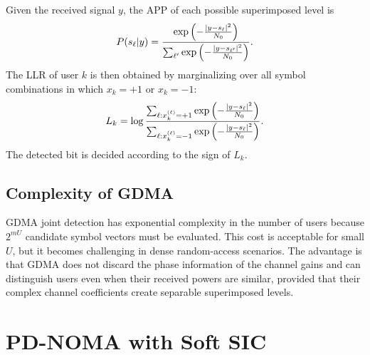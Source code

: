 Given the received signal $y$, the APP of each possible superimposed level is
\begin{equation}
    P(s_\ell|y) =
    \frac{\exp\left(-\frac{\left\lvert y-s_\ell \right\rvert^2}{N_0}\right)}
    {\sum_{\ell'}\exp\left(-\frac{\left\lvert y-s_{\ell'} \right\rvert^2}{N_0}\right)} .
\end{equation}
The LLR of user $k$ is then obtained by marginalizing over all symbol combinations in which $x_k=+1$ or $x_k=-1$:
\begin{equation}
    L_k
    =\log
    \frac{
    \sum_{\ell:x_k^{(\ell)}=+1}
    \exp\left(-\frac{\left\lvert y-s_\ell \right\rvert^2}{N_0}\right)}
    {\sum_{\ell:x_k^{(\ell)}=-1}
    \exp\left(-\frac{\left\lvert y-s_\ell \right\rvert^2}{N_0}\right)} .
    \label{eq:gdma-llr}
\end{equation}
The detected bit is decided according to the sign of $L_k$.



\subsection{Complexity of GDMA}

GDMA joint detection has exponential complexity in the number of users because $2^{mU}$ candidate symbol vectors must be evaluated. This cost is acceptable for small $U$, but it becomes challenging in dense random-access scenarios. The advantage is that GDMA does not discard the phase information of the channel gains and can distinguish users even when their received powers are similar, provided that their complex channel coefficients create separable superimposed levels.

\section{PD-NOMA with Soft SIC}

